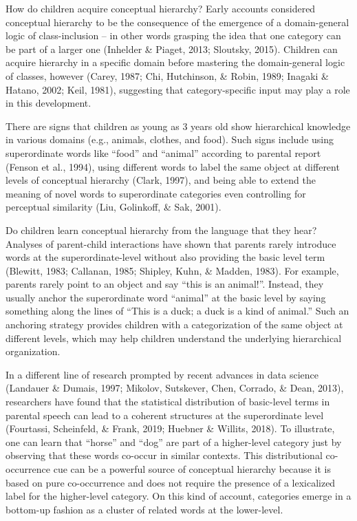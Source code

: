 \documentclass[10pt, letterpaper]{article}
\begin{document}
How do children acquire conceptual hierarchy? Early accounts considered
conceptual hierarchy to be the consequence of the emergence of a
domain-general logic of class-inclusion -- in other words grasping the
idea that one category can be part of a larger one (Inhelder \& Piaget,
2013; Sloutsky, 2015). Children can acquire hierarchy in a specific
domain before mastering the domain-general logic of classes, however
(Carey, 1987; Chi, Hutchinson, \& Robin, 1989; Inagaki \& Hatano, 2002;
Keil, 1981), suggesting that category-specific input may play a role in
this development.

There are signs that children as young as 3 years old show hierarchical
knowledge in various domains (e.g., animals, clothes, and food). Such
signs include using superordinate words like ``food'' and ``animal''
according to parental report (Fenson et al., 1994), using different
words to label the same object at different levels of conceptual
hierarchy (Clark, 1997), and being able to extend the meaning of novel
words to superordinate categories even controlling for perceptual
similarity (Liu, Golinkoff, \& Sak, 2001).

Do children learn conceptual hierarchy from the language that they hear?
Analyses of parent-child interactions have shown that parents rarely
introduce words at the superordinate-level without also providing the
basic level term (Blewitt, 1983; Callanan, 1985; Shipley, Kuhn, \&
Madden, 1983). For example, parents rarely point to an object and say
``this is an animal!''. Instead, they usually anchor the superordinate
word ``animal'' at the basic level by saying something along the lines
of ``This is a duck; a duck is a kind of animal.'' Such an anchoring
strategy provides children with a categorization of the same object at
different levels, which may help children understand the underlying
hierarchical organization.

In a different line of research prompted by recent advances in data
science (Landauer \& Dumais, 1997; Mikolov, Sutskever, Chen, Corrado, \&
Dean, 2013), researchers have found that the statistical distribution of
basic-level terms in parental speech can lead to a coherent structures
at the superordinate level (Fourtassi, Scheinfeld, \& Frank, 2019;
Huebner \& Willits, 2018). To illustrate, one can learn that ``horse''
and ``dog'' are part of a higher-level category just by observing that
these words co-occur in similar contexts. This distributional
co-occurrence cue can be a powerful source of conceptual hierarchy
because it is based on pure co-occurrence and does not require the
presence of a lexicalized label for the higher-level category. On this
kind of account, categories emerge in a bottom-up fashion as a cluster
of related words at the lower-level.
\end{document}
